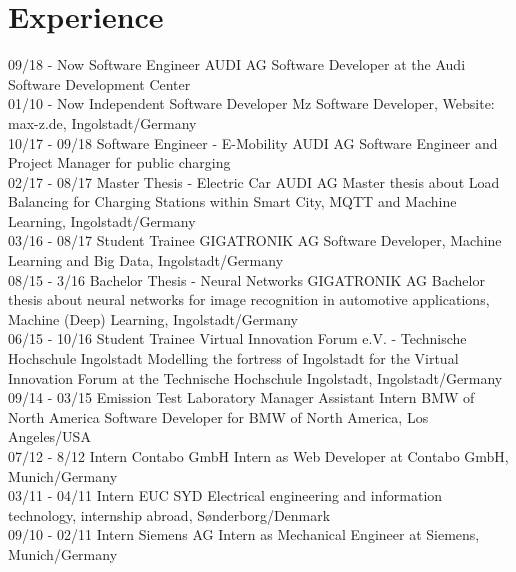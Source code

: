 \documentclass[]{friggeri-cv}
\begin{document}
\section{Experience}
\begin{entrylist}
    \entry
    {09/18 - Now}
    {Software Engineer}
    {AUDI AG}
    {Software Developer at the Audi Software Development Center\\}
     \entry
    {01/10 - Now}
    {Independent Software Developer}
    {Mz}
    {Software Developer, Website: max-z.de, Ingolstadt/Germany\\}
    \entry
    {10/17 - 09/18}
    {Software Engineer - E-Mobility}
    {AUDI AG}
    {Software Engineer and Project Manager for public charging \\}
    \entry
    {02/17 - 08/17}
    {Master Thesis - Electric Car}
    {AUDI AG}
    {Master thesis about Load Balancing for Charging Stations within Smart City, MQTT and Machine Learning, Ingolstadt/Germany\\}
    \entry
    {03/16 - 08/17}
    {Student Trainee}
    {GIGATRONIK AG}
    {Software Developer, Machine Learning and Big Data,  Ingolstadt/Germany\\}
    \entry
    {08/15 - 3/16}
    {Bachelor Thesis - Neural Networks}
    {GIGATRONIK AG}
    {Bachelor thesis about neural networks for image recognition in automotive applications, Machine (Deep) Learning, Ingolstadt/Germany\\}
    \entry
    {06/15 - 10/16}
    {Student Trainee}
    {Virtual Innovation Forum e.V. - Technische Hochschule Ingolstadt}
    {Modelling the fortress of Ingolstadt for the Virtual Innovation Forum at the Technische Hochschule Ingolstadt, Ingolstadt/Germany\\}
  \entry
    {09/14 - 03/15}
    {Emission Test Laboratory Manager Assistant Intern}
    {BMW of North America}
    {Software Developer for BMW of North America, Los Angeles/USA\\}
  \entry
    {07/12 - 8/12}
    {Intern}
    {Contabo GmbH}
    {Intern as Web Developer at Contabo GmbH, Munich/Germany\\}
    \entry
    {03/11 - 04/11}
    {Intern}
    {EUC SYD}
    {Electrical engineering and information technology,  internship abroad, Sønderborg/Denmark\\}
    \entry
    {09/10 - 02/11}
    {Intern}
    {Siemens AG}
    {Intern as Mechanical Engineer at Siemens, Munich/Germany\\}
\end{entrylist}
\end{document}
